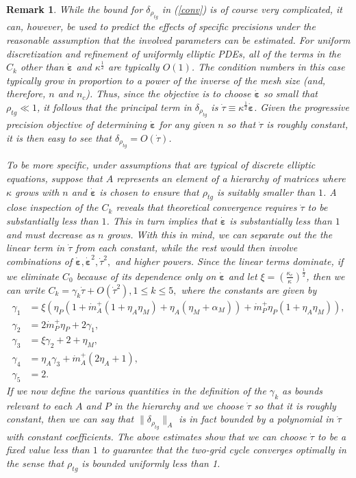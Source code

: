 \documentclass[onefignum,onetabnum]{siamart220329}
\newtheorem{rem}{Remark}
\newcommand{\ewed}{\boldsymbol{\dot{\varepsilon}}}
\newcommand{\aladot}{{\dot{m}}_A^+}
\newcommand{\alpdot}{{\dot{m}}_P^+}
\newcommand{\pvar}{\tau}
\newcommand{\pvard}{{\dot{\pvar}}}
\begin{document}
{\begin{rem}
While the bound for $\delta_{\rho_{tg}}$ in (\ref{conv}) is of course very complicated, it can, however, be used to predict the effects of specific precisions under the reasonable assumption that the involved parameters can be estimated. For uniform discretization and refinement of uniformly elliptic PDEs, all of the terms in the $C_k$ other than $\ewed$ and $\kappa^\frac{1}{2}$ are typically $O(1)$. The condition numbers in this case typically grow in proportion to a power of the inverse of the mesh size (and, therefore, $n$ and $n_c$). Thus, since the objective is to choose $\ewed$ so small that $\rho_{tg} \ll 1$, it follows that the principal term in $\delta_{\rho_{tg}}$ is $\pvard \equiv \kappa^\frac{1}{2} \ewed$. Given the {\em progressive precision} objective of determining $\ewed$ for any given $n$ so that $\pvard$ is roughly constant, it is then easy to see that $\delta_{\rho_{tg}} = O(\pvard)$.

To be more specific, under assumptions that are typical of discrete elliptic equations, suppose that $A$ represents an element of a hierarchy of matrices where $\kappa$ grows with $n$ and $\ewed$ is chosen to ensure that $\rho_{tg}$ is suitably smaller than $1$. A close inspection of the $C_k$ reveals that theoretical convergence requires $\pvard$ to be substantially less than $1$. This in turn implies that $\ewed$ is substantially less than $1$ and must decrease as $n$ grows.  With this in mind, we can separate out the the linear term in $\pvard$ from each constant, while the rest would then involve combinations of $\ewed, \ewed^2, \pvard^2,$ and higher powers. Since the linear terms dominate, if we eliminate $C_0$ because of its dependence only on $\ewed$ and let $\xi = \left(\frac{\kappa_c}{\kappa}\right)^\frac{1}{2}$, then we can write $C_k = \gamma_k \pvard +O(\pvard^2), 1 \le k \le 5,$ where the constants are given by
\begin{align*}
\gamma_1 &= \xi (\eta_P (1 + \aladot (1 + \eta_A \eta_M) + \eta_A (\eta_M + \alpha_M)) + \alpdot \eta_P (1 + \eta_A \eta_M)) ,\\
\gamma_2 &= 2 \alpdot \eta_P + 2 \gamma_1, \\
\gamma_3 &= \xi \gamma_2 + 2 + \eta_M, \\
\gamma_4 &= \eta_A \gamma_3 + \aladot (2 \eta_A + 1), \\
\gamma_5 &= 2.
\end{align*}
If we now define the various quantities in the definition of the $\gamma_k$ as bounds relevant to each $A$ and $P$ in the hierarchy and we choose $\pvard$ so that it is roughly constant, then we can say that $\|\delta_{\rho_{tg}}\|_A$ is in fact bounded by a polynomial in $\pvard$ with constant coefficients. The above estimates show that we can choose $\pvard$ to be a fixed value less than $1$ to guarantee that the two-grid cycle converges optimally in the sense that $\rho_{tg}$ is bounded uniformly less than 1.
\label{constants}
\end{rem}

}
\end{document}
